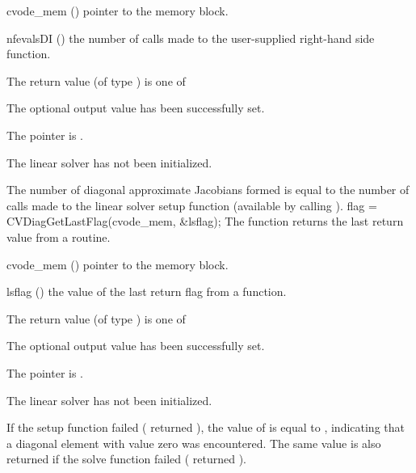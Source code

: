 {
  \begin{args}
  \item[cvode\_mem] ()
    pointer to the {\cvodes} memory block.
  \item[nfevalsDI] ()
    the number of calls made to the user-supplied right-hand side function.
  \end{args}
}
{
  The return value  (of type ) is one of
  \begin{args}
  \item[\Id{CVDIAG\_SUCCESS}] 
    The optional output value has been successfully set.
  \item[\Id{CVDIAG\_MEM\_NULL}]
    The  pointer is .
  \item[\Id{CVDIAG\_LMEM\_NULL}]
    The {\cvdiag} linear solver has not been initialized.
  \end{args}
}
{
  The number of diagonal approximate Jacobians formed is
  equal to the number of calls made to the linear solver setup function
  (available by calling ).
}
{
  flag = CVDiagGetLastFlag(cvode\_mem, \&lsflag);
}
{
  The function  returns the
  last return value from a {\cvdiag} routine. 
}
{
  \begin{args}
  \item[cvode\_mem] ()
    pointer to the {\cvodes} memory block.
  \item[lsflag] ()
    the value of the last return flag from a {\cvdiag} function.
  \end{args}
}
{
  The return value  (of type ) is one of
  \begin{args}
  \item[\Id{CVDIAG\_SUCCESS}] 
    The optional output value has been successfully set.
  \item[\Id{CVDIAG\_MEM\_NULL}]
    The  pointer is .
  \item[\Id{CVDIAG\_LMEM\_NULL}]
    The {\cvdiag} linear solver has not been initialized.
  \end{args}
}
{
  If the {\cvdiag} setup function failed ( returned ),
  the value of  is equal to , indicating that a
  diagonal element with value zero was encountered.
  The same value is also returned if the {\cvdiag} solve function failed
  ( returned ).
}

